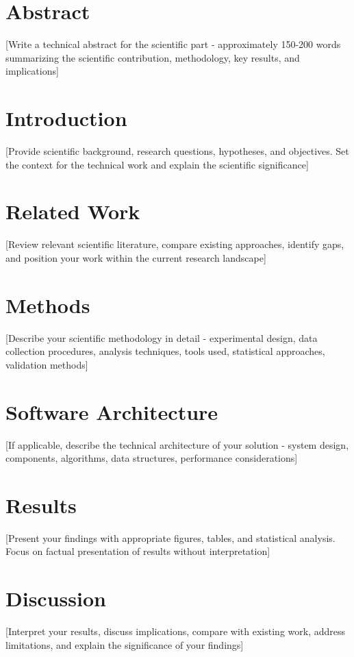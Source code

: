 \documentclass[11pt,a4paper,oneside]{book}
\begin{document}
\begin{multicols}{2}
\footnotesize %

\section*{Abstract}
[Write a technical abstract for the scientific part - approximately 150-200 words summarizing the scientific contribution, methodology, key results, and implications]

\section{Introduction}
[Provide scientific background, research questions, hypotheses, and objectives. Set the context for the technical work and explain the scientific significance]

\section{Related Work}
[Review relevant scientific literature, compare existing approaches, identify gaps, and position your work within the current research landscape]

\section{Methods}
[Describe your scientific methodology in detail - experimental design, data collection procedures, analysis techniques, tools used, statistical approaches, validation methods]

\section{Software Architecture}
[If applicable, describe the technical architecture of your solution - system design, components, algorithms, data structures, performance considerations]

\section{Results}
[Present your findings with appropriate figures, tables, and statistical analysis. Focus on factual presentation of results without interpretation]

\section{Discussion}
[Interpret your results, discuss implications, compare with existing work, address limitations, and explain the significance of your findings]


\end{multicols}
\end{document}
